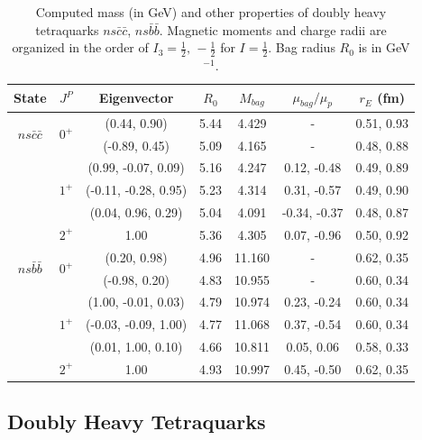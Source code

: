 \documentclass[12pt,prd,onecolumn,floatfix,nofootinbib]{revtex4}
\begin{document}
\renewcommand{\tabcolsep}{0.52cm} \renewcommand{\arraystretch}{1.1}
\begin{table}[!htb]
\setlength{\abovecaptionskip}{0.4cm}
\caption{Computed mass (in GeV) and other properties of doubly heavy
tetraquarks $ns\bar{c}\bar{c}$, $ns\bar{b}\bar{b}$. Magnetic moments and
charge radii are organized in the order of $I_{3}=\frac{1}{2},\,-\frac{1}{2}$
for $I=\frac{1}{2}$. Bag radius $R_{0}$ is in GeV$^{-1}$. }
\label{tab:2heavytetraquark1/2}%
\begin{tabular}{ccccccc}
\hline\hline
\textrm{State} & $J^{P}$ & \textrm{Eigenvector} & $R_{0}$ & $M_{bag}$ & $%
\mu_{bag}/\mu_{p}$ & $r_{E}$ (fm) \\ \hline
\multirow{2}{*}{$ns\bar{c}\bar{c}$} & \multirow{2}{*}{$0^{+}$} & (0.44, 0.90)
& 5.44 & 4.429 & - & 0.51, 0.93 \\
&  & (-0.89, 0.45) & 5.09 & 4.165 & - & 0.48, 0.88 \\
& \multirow{3}{*}{$1^{+}$} & (0.99, -0.07, 0.09) & 5.16 & 4.247 & 0.12, -0.48
& 0.49, 0.89 \\
&  & (-0.11, -0.28, 0.95) & 5.23 & 4.314 & 0.31, -0.57 & 0.49, 0.90 \\
&  & (0.04, 0.96, 0.29) & 5.04 & 4.091 & -0.34, -0.37 & 0.48, 0.87 \\
& $2^{+}$ & 1.00 & 5.36 & 4.305 & 0.07, -0.96 & 0.50, 0.92 \\
\multirow{2}{*}{$ns\bar{b}\bar{b}$} & \multirow{2}{*}{$0^{+}$} & (0.20, 0.98)
& 4.96 & 11.160 & - & 0.62, 0.35 \\
&  & (-0.98, 0.20) & 4.83 & 10.955 & - & 0.60, 0.34 \\
& \multirow{3}{*}{$1^{+}$} & (1.00, -0.01, 0.03) & 4.79 & 10.974 & 0.23,
-0.24 & 0.60, 0.34 \\
&  & (-0.03, -0.09, 1.00) & 4.77 & 11.068 & 0.37, -0.54 & 0.60, 0.34 \\
&  & (0.01, 1.00, 0.10) & 4.66 & 10.811 & 0.05, 0.06 & 0.58, 0.33 \\
& $2^{+}$ & 1.00 & 4.93 & 10.997 & 0.45, -0.50 & 0.62, 0.35 \\ \hline\hline
\end{tabular}%
\end{table}

\subsection{Doubly Heavy Tetraquarks}
\end{document}
